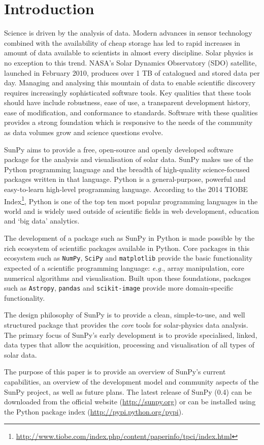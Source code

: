 \section{Introduction}

Science is driven by the analysis of data. Modern advances in sensor
technology combined with the availability of cheap storage has led to
rapid increases in amount of data available to scientists in almost
every discipline.  Solar physics is no exception to this trend. NASA's
Solar Dynamics Observatory (SDO) satellite, launched in February 2010,
produces over 1 TB of catalogued and stored data per day. Managing and
analysing this mountain of data to enable scientific discovery
requires increasingly sophisticated software tools.  Key qualities
that these tools should have include robustness, ease of use, a
transparent development history, ease of modification, and conformance
to standards.  Software with these qualities provides a strong
foundation which is responsive to the needs of the community as data
volumes grow and science questions evolve.

SunPy aims to provide a free, open-source and openly developed software package 
for the analysis and visualisation of solar data. SunPy makes use of the Python 
programming language and the breadth of high-quality science-focused packages 
written in that language. Python is a general-purpose, 
powerful and easy-to-learn high-level programming language.
According to the 
2014 TIOBE Index\footnote{\url{http://www.tiobe.com/index.php/content/paperinfo/tpci/index.html}},
 Python is one of the top ten most popular programming languages in the world 
and is widely used outside of scientific fields in web development, education 
and `big data' analytics.

The development of a package such as SunPy in Python is made possible by the 
rich ecosystem of scientific packages available in Python. Core packages in this 
ecosystem such as \texttt{NumPy}, \texttt{SciPy} and \texttt{matplotlib} 
provide the basic functionality expected of a scientific programming language: 
\textit{e.g.}, array manipulation, core numerical algorithms and visualisation. 
Built upon these foundations, packages such as \texttt{Astropy}, \texttt{pandas} and 
\texttt{scikit-image} provide more domain-specific functionality.

The design philosophy of SunPy is to provide a clean, simple-to-use, and well 
structured package that provides the \textit{core} tools for solar-physics data analysis. The 
primary focus of SunPy's early development is to provide specialised, linked, 
data types that allow the acquisition, processing and visualisation of all types 
of solar data.

The purpose of this paper is to provide an overview of SunPy's current 
capabilities, an overview of the development model and community aspects of the 
SunPy project, as well as future plans. The latest release of SunPy (0.4)
can be downloaded from
the official website (\url{http://sunpy.org}) or can be installed using 
the Python package index (\mbox{\url{http://pypi.python.org/pypi}}).
